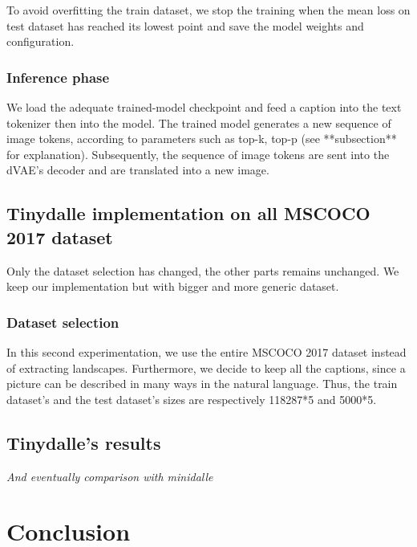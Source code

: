 \documentclass{article}
\begin{document}
To avoid overfitting the train dataset, we stop the training when the mean loss on test dataset has reached its lowest point and save the model weights and configuration.

\subsubsection{Inference phase}

We load the adequate trained-model checkpoint and feed a caption into the text tokenizer then into the model. The trained model generates a new sequence of image tokens, according to parameters such as top-k, top-p (see **subsection** for explanation). Subsequently, the sequence of image tokens are sent into the dVAE's decoder and are translated into a new image.

\subsection{Tinydalle implementation on all MSCOCO 2017 dataset}

Only the dataset selection has changed, the other parts remains unchanged. We keep our implementation but with bigger and more generic dataset.

\subsubsection{Dataset selection}

In this second experimentation, we use the entire MSCOCO 2017 dataset instead of extracting landscapes. Furthermore, we decide to keep all the captions, since a picture can be described in many ways in the natural language. Thus, the train dataset's and the test dataset's sizes are respectively 118287*5 and 5000*5.



\subsection{Tinydalle's results}\label{subsec:tinydalle_results}

\textit{And eventually comparison with minidalle}

\pagebreak

\section{Conclusion}

\pagebreak
{}
{}
\end{document}
